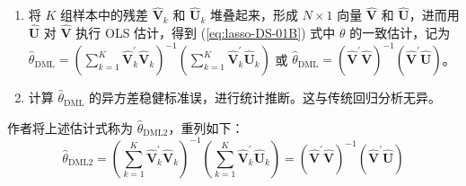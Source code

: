 {\begin{enumerate}
   \begin{enumerate}
   \item 去一折估计 (leave-one-fold-out)。针对样本 $\S_{-k}$，使用 Lasso 或 Post-Lasso 分别估计 (\ref{eq:lasso-Hansen2021-29-23}) 和 (\ref{eq:lasso-Hansen2021-29-24}) 式，得到 $\gamma$ and $\eta$ 的估计值，记为$\hat{\gamma}_{-k}$ and $\widehat{\eta}_{-k}$。 
   \item 获取第 $k$ 折样本的残差。将 $\hat{\gamma}_{-k}$ 和 $\widehat{\eta}_{-k}$ 带入第 $k$ 折样本 $S_{k}$，计算 (\ref{eq:lasso-Hansen2021-29-23}) 和 (\ref{eq:lasso-Hansen2021-29-24}) 式对应的残差  $\widehat{\boldsymbol{V}}_{k}=\boldsymbol{D}_{k}-\boldsymbol{X}_{k} \widehat{\gamma}_{-k}$ and $\widehat{\boldsymbol{U}}_{k}=\boldsymbol{Y}_{k}-\boldsymbol{X}_{k} \widehat{\eta}_{-k}$。简言之，采用基于 $\S_{-k}$ 样本估得的参数来预测 $S_k$ 样本中的残差。
   \end{enumerate}
\item 将 $K$ 组样本中的残差 $\widehat{\boldsymbol{V}}_{k}$ 和 $\widehat{\boldsymbol{U}}_{k}$ 堆叠起来，形成 $N \times 1$ 向量 $\widehat{\boldsymbol{V}}$ 和 $\widehat{\boldsymbol{U}}$，进而用 $\widehat{\boldsymbol{U}}$ 对 $\widehat{\boldsymbol{V}}$ 执行 OLS 估计，得到 (\ref{eq:lasso-DS-01B}) 式中 $\theta$ 的一致估计，记为  $\widehat{\theta}_{\mathrm{DML}}=\left(\sum_{k=1}^{K} \widehat{\boldsymbol{V}}_{k}^{\prime} \widehat{\boldsymbol{V}}_{k}\right)^{-1}\left(\sum_{k=1}^{K} \widehat{\boldsymbol{V}}_{k}^{\prime} \widehat{\boldsymbol{U}}_{k}\right)$ 或 $\widehat{\theta}_{\mathrm{DML}}=(\widehat{\boldsymbol{V}}^{\prime} \widehat{\boldsymbol{V}})^{-1}(\widehat{\boldsymbol{V}}^{\prime} \widehat{\boldsymbol{U}})$。
\item 计算 $\widehat{\theta}_{\mathrm{DML}}$ 的异方差稳健标准误，进行统计推断。这与传统回归分析无异。
\end{enumerate}

作者将上述估计式称为 $\widehat{\theta}_{\mathrm{DML2}}$，重列如下：
\begin{equation}\label{eq:lasso-DML-01}
	 \widehat{\theta}_{\mathrm{DML2}}
	 =
	 \left(\sum_{k=1}^{K} \widehat{\boldsymbol{V}}_{k}^{\prime} \widehat{\boldsymbol{V}}_{k}\right)^{-1}\left(\sum_{k=1}^{K} \widehat{\boldsymbol{V}}_{k}^{\prime} \widehat{\boldsymbol{U}}_{k}\right)
	 =
	 \left(\widehat{\boldsymbol{V}}^{\prime} \widehat{\boldsymbol{V}}\right)^{-1}\left(\widehat{\boldsymbol{V}}^{\prime} \widehat{\boldsymbol{U}}\right)
\end{equation}

}
